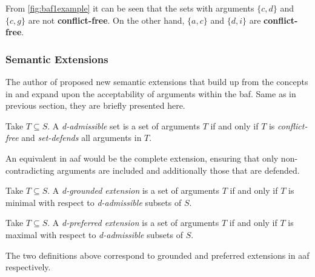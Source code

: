             \begin{exa}
                From \autoref{fig:baf1example} it can be seen that the sets with arguments $\{c, d\}$ and $\{c, g\}$ are not \textbf{conflict-free}. On the other hand, $\{a, c\}$ and $\{d, i\}$ are \textbf{conflict-free}.
                \label{exa:example14}
            \end{exa}
            
        \subsubsection{Semantic Extensions}
            The author of \autocite{Cayrol2005OnTA} proposed new semantic extensions that build up from the concepts in \autocite{Dung1995OnTA} and expand upon the acceptability of arguments within the \gls{baf}. Same as in previous section, they are briefly presented here.
            
            \begin{definition}
                Take $T \subseteq S$. A \textit{d-admissible} set is a set of arguments $T$ if and only if $T$ is \textit{conflict-free} and \textit{set-defends} all arguments in $T$.
                \label{definition:definition20}
            \end{definition}
            
            An equivalent in \gls{aaf} would be the complete extension, ensuring that only non-contradicting arguments are included and additionally those that are defended.
            
            \begin{definition}
                Take $T \subseteq S$. A \textit{d-grounded extension} is a set of arguments $T$ if and only if $T$ is minimal with respect to \textit{d-admissible} subsets of $S$. 
                \label{definition:definition23}
            \end{definition}
            
            \begin{definition}
                Take $T \subseteq S$. A \textit{d-preferred extension} is a set of arguments $T$ if and only if $T$ is maximal with respect to \textit{d-admissible} subsets of $S$. 
                \label{definition:definition24}
            \end{definition}
            
            The two definitions above correspond to grounded and preferred extensions in \gls{aaf} respectively.
            
